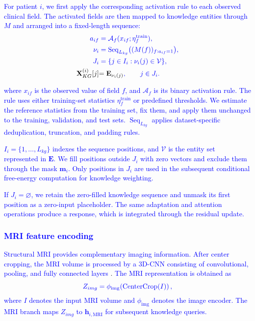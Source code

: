 \documentclass[lettersize,journal]{IEEEtran}
\begin{document}
\textcolor{blue}{For patient $i$, we first apply the corresponding activation rule to each observed clinical field. The activated fields are then mapped to knowledge entities through $M$ and arranged into a fixed-length sequence:}
\begin{equation}
    {\color{blue}
    \begin{aligned}
    a_{if} &= \mathcal{A}_f(x_{if};\eta_f^{\mathrm{train}}),\\
    \nu_i &= \operatorname{Seq}_{L_{kg}}\bigl((M(f))_{f:a_{if}=1}\bigr),\\
    J_i &= \{j\in I_i:\nu_i(j)\in\mathcal{V}\},\\
    {\color{black}\mathbf{X}_{KG}^{(i)}[j]} &{\color{black}= \mathbf{E}_{\nu_i(j)}},\qquad j\in J_i.
    \end{aligned}
    }
    \label{eq:patient_activation}
\end{equation}

\textcolor{blue}{where $x_{if}$ is the observed value of field $f$, and $\mathcal{A}_f$ is its binary activation rule. The rule uses either training-set statistics $\eta_f^{\mathrm{train}}$ or predefined thresholds. We estimate the reference statistics from the training set, fix them, and apply them unchanged to the training, validation, and test sets. $\operatorname{Seq}_{L_{kg}}$ applies dataset-specific deduplication, truncation, and padding rules.}

\textcolor{blue}{$I_i=\{1,\ldots,L_{kg}\}$ indexes the sequence positions, and $\mathcal{V}$ is the entity set represented in $\mathbf{E}$. We fill positions outside $J_i$ with zero vectors and exclude them through the mask $\mathbf{m}_i$. Only positions in $J_i$ are used in the subsequent conditional free-energy computation for knowledge weighting.}

\textcolor{blue}{If $J_i=\varnothing$, we retain the zero-filled knowledge sequence and unmask its first position as a zero-input placeholder. The same adaptation and attention operations produce a response, which is integrated through the residual update.}


\subsubsection{\textcolor{blue}{MRI feature encoding}}
    
     \textcolor{blue}{Structural MRI provides complementary imaging information. After center cropping, the MRI volume is processed by a 3D-CNN consisting of convolutional, pooling, and fully connected layers} \cite{wen2020convolutional,tran2015c3d}. \textcolor{blue}{The MRI representation is obtained as}
     \begin{equation}
     {\color{blue}Z_{img} = \phi_{\mathrm{img}}\!\left(\operatorname{CenterCrop}(I)\right),}
     \label{eq:mri_projection}
     \end{equation}
     \textcolor{blue}{where $I$ denotes the input MRI volume and $\phi_{\mathrm{img}}$ denotes the image encoder. The MRI branch maps $Z_{img}$ to $\mathbf h_{i,\mathrm{MRI}}$ for subsequent knowledge queries.}
\end{document}
